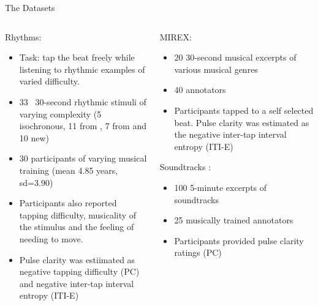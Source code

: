 \documentclass[final]{beamer}
\newcommand{\hemph}[1]{{\color{mitred}#1}}
\begin{document}
\begin{frame}[t]
\begin{columns}[T]
\begin{column}{0.93\textwidth}
\begin{column}{0.472\textwidth}
\begin{block}{The Datasets}
{\begin{columns}
\begin{column}{0.49\textwidth}
            \vspace{0.7em}
            \hemph{Rhythms:}
            \begin{itemize}
              \item {Task:} tap the beat freely while
            listening to rhythmic examples of varied difficulty.
              \item 33 ~30-second rhythmic stimuli of varying complexity (5
                isochronous, 11 from \cite{fitch2007perception}, 7 from
                \cite{povel1985perception} and 10 new)
              \item 30 participants of varying musical training (mean 4.85 years,
                sd=3.90)
              \item Participants also reported tapping difficulty, musicality of
                the stimulus and the feeling of needing to move.
              \item Pulse clarity was estiimated as negative tapping difficulty
                (PC) and negative inter-tap interval entropy (ITI-E)                
            \end{itemize}
            \end{column}
            \begin{column}{0.49\textwidth}
              \hemph{MIREX: \nocite{website:mirex}}
                \begin{itemize}
                \item 20 30-second musical excerpts of various musical genres
                \item 40 annotators
                \item Participants tapped to a self selected beat. Pulse clarity was
                 estimated as the negative inter-tap interval entropy (ITI-E)                
               \end{itemize}
              \hemph{Soundtracks \citep{lartillot2008multi, eerola2020dataset}:} 
                \begin{itemize}
                  \item 100 5-minute excerpts of soundtracks
                  \item 25 musically trained annotators
                  \item Participants provided pulse clarity ratings (PC)
                \end{itemize}
            \end{column}
          \end{columns}
}
\end{block}
\end{column}
\end{column}
\end{columns}
\end{frame}
\end{document}
